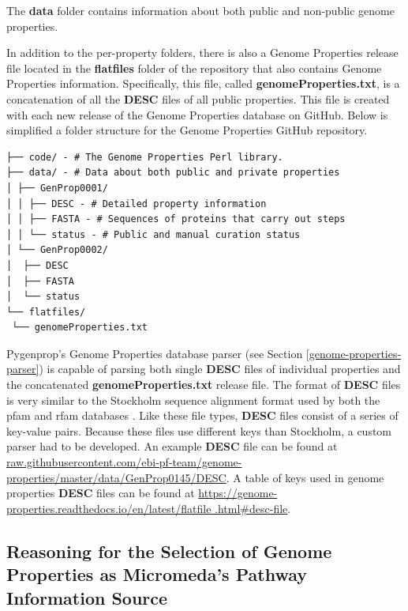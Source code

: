 The \textbf{data} folder contains information about both public and non-public 
genome properties. 

In addition to the per-property folders, there is also a Genome Properties 
release file located in the \textbf{flatfiles} folder of the repository that 
also contains Genome Properties information. Specifically, this file, called 
\textbf{genomeProperties.txt}, is a concatenation of all the \textbf{DESC} files 
of all public properties. This file is created with each new release of the 
Genome Properties database on GitHub. Below is simplified a folder structure for 
the Genome Properties GitHub repository.

\begin{verbatim}
├── code/ - # The Genome Properties Perl library.
├── data/ - # Data about both public and private properties
│ ├── GenProp0001/
│ │ ├── DESC - # Detailed property information
│ │ ├── FASTA - # Sequences of proteins that carry out steps
│ │ └── status - # Public and manual curation status
│ └── GenProp0002/
│  ├── DESC
│  ├── FASTA
│  └── status
└── flatfiles/
 └── genomeProperties.txt
\end{verbatim}

Pygenprop's Genome Properties database parser (see Section 
\ref{genome-properties-parser}) is capable of parsing both single \textbf{DESC} 
files of individual properties and the concatenated 
\textbf{genomeProperties.txt} release file. The format of \textbf{DESC} files is 
very similar to the Stockholm sequence alignment format used by both the 
\gls{pfam} and \gls{rfam} databases \cite{bateman2004pfam, griffiths2003rfam}. Like 
these file types, \textbf{DESC} files consist of a series of key-value pairs. 
Because these files use different keys than Stockholm, a custom parser had to be 
developed. An example \textbf{DESC} file can be found at 
\href{http://raw.githubusercontent.com/ebi-pf-team/genome-properties/master/data/GenProp0145/DESC}{raw.githubusercontent.com/ebi-pf-team/genome-properties/master/data/GenProp0145/DESC}. 
A table of keys used in  genome properties \textbf{DESC} files can be found at 
\href{https://genome-properties.readthedocs.io/en/latest/flatfile.html#desc-file}{https://genome-properties.readthedocs.io/en/latest/flatfile .html\#desc-file}.

\subsection{Reasoning for the Selection of Genome Properties as Micromeda's 
Pathway Information Source} \label{reason-for-genome-properties-selection}

